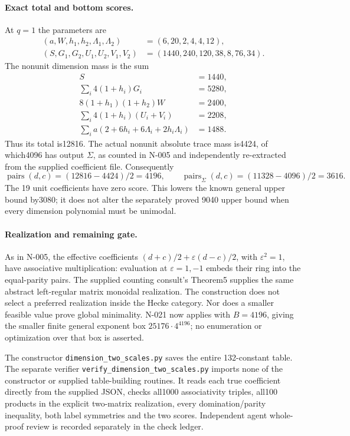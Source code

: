 \paragraph{Exact total and bottom scores.}
At $q=1$ the parameters are
\[
\begin{aligned}
 (a,W,h_1,h_2,\Lambda_1,\Lambda_2)&=(6,20,2,4,4,12),\\
 (S,G_1,G_2,U_1,U_2,V_1,V_2)&=(1440,240,120,38,8,76,34).
\end{aligned}
\]
The nonunit dimension mass is the sum
\[
\begin{aligned}
 S&=1440,\\
 \sum_i4(1+h_i)G_i&=5280,\\
 8(1+h_1)(1+h_2)W&=2400,\\
 \sum_i4(1+h_i)(U_i+V_i)&=2208,\\
 \sum_i a(2+6h_i+6\Lambda_i+2h_i\Lambda_i)&=1488.
\end{aligned}\tag{N-134}
\]
Thus its total is12816.  The actual nonunit absolute trace mass is4424,
of which4096 has output $\Sigma$, as counted in N-005 and independently
re-extracted from the supplied coefficient file.  Consequently
\[
 \boxed{\operatorname{pairs}(d,c)=(12816-4424)/2=4196},\qquad
 \boxed{\operatorname{pairs}_{\Sigma}(d,c)=(11328-4096)/2=3616}.
 \tag{N-135}
\]
The 19 unit coefficients have zero score.  This lowers the known
general upper bound by3080; it does not alter the separately proved
9040 upper bound when every dimension polynomial must be unimodal.

\paragraph{Realization and remaining gate.}
As in N-005, the effective coefficients
$(d+c)/2+\varepsilon(d-c)/2$, with $\varepsilon^2=1$, have associative
multiplication: evaluation at $\varepsilon=1,-1$ embeds their ring
into the equal-parity pairs.  The supplied counting consult's
Theorem5 supplies the same abstract left-regular matrix monoidal
realization.  The construction does not select a preferred realization
inside the Hecke category.  Nor does a smaller feasible value prove
global minimality.  N-021 now applies with $B=4196$, giving the smaller
finite general exponent box $25176\cdot4^{4196}$; no enumeration or
optimization over that box is asserted.

The constructor \nolinkurl{dimension_two_scales.py} saves the entire
132-constant table.  The separate verifier
\nolinkurl{verify_dimension_two_scales.py} imports none of the
constructor or supplied table-building routines.  It reads each true
coefficient directly from the supplied JSON, checks all1000
associativity triples, all100 products in the explicit two-matrix
realization, every domination/parity inequality, both label symmetries
and the two scores.  Independent agent whole-proof review is recorded
separately in the check ledger.

